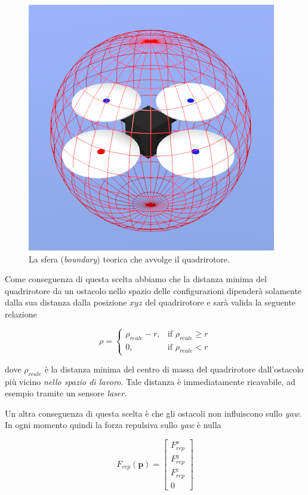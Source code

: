 \documentclass[a4paper,10pt]{article}
\begin{document}
\begin{figure}
\begin{center}
\includegraphics[scale=0.5]{img/boundarysphere.png}
\caption{La sfera (\emph{boundary}) teorica che avvolge il quadrirotore. }
\end{center}
\label{fig:boundary}
\end{figure}

Come conseguenza di questa scelta abbiamo che la distanza minima del quadrirotore da un ostacolo nello spazio delle configurazioni   dipenderà solamente dalla sua distanza dalla posizione $x y z$ del quadrirotore e sarà valida la seguente relazione

\begin{equation}
\rho = \begin{cases}
\rho_{reale} - r ,& \mbox{if } \rho_{reale} \ge r \\
0 ,& \mbox{if } \rho_{reale} < r
\end{cases}
\end{equation} 

\noindent dove $\rho_{reale}$ è la distanza minima del centro di massa del quadrirotore dall'ostacolo più vicino \emph{nello spazio di lavoro}. Tale distanza è immediatamente ricavabile, ad esempio tramite un sensore \emph{laser}.

Un altra conseguenza di questa scelta è che gli ostacoli non influiscono sullo \emph{yaw}. In ogni momento quindi la forza repulsiva sullo \emph{yaw} è nulla

\begin{equation}
F_{rep}(\mathbf{p}) = \left[\begin{matrix}
F_{rep}^x \\
F_{rep}^y \\
F_{rep}^z \\
0
\end{matrix}\right]
\end{equation}
\end{document}
